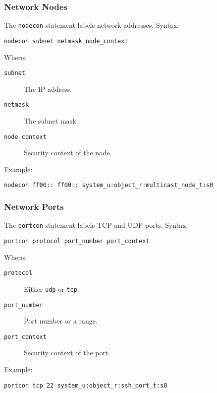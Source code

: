\subsubsection{Network Nodes}
The \texttt{nodecon} statement labels network addresses. Syntax:
\begin{lstlisting}[language=te]
nodecon subnet netmask node_context
\end{lstlisting}
Where:
\begin{description}
    \item [\texttt{subnet}] The IP address.
    \item [\texttt{netmask}] The subnet mask.
    \item [\texttt{node\_context}] Security context of the node.
\end{description}
Example:
\begin{lstlisting}[language=te]
nodecon ff00:: ff00:: system_u:object_r:multicast_node_t:s0
\end{lstlisting}

\subsubsection{Network Ports}
The \texttt{portcon} statement labels TCP and UDP ports. Syntax:
\begin{lstlisting}[language=te]
portcon protocol port_number port_context
\end{lstlisting}
Where:
\begin{description}
    \item [\texttt{protocol}] Either \texttt{udp} or \texttt{tcp}.
    \item [\texttt{port\_number}] Port number or a range.
    \item [\texttt{port\_context}] Security context of the port.
\end{description}
Example:
\begin{lstlisting}[language=te]
portcon tcp 22 system_u:object_r:ssh_port_t:s0
\end{lstlisting}


